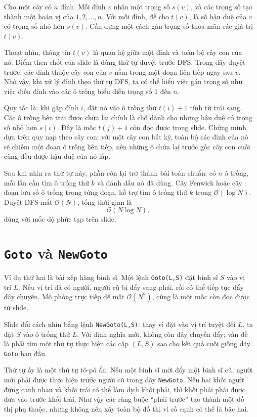 \documentclass[11pt]{article}
\newcommand{\Oh}{\mathcal{O}}
\begin{document}
Cho một cây có \(n\) đỉnh. Mỗi đỉnh \(v\) nhận một trọng số \(s(v)\), và các
trọng số tạo thành một hoán vị của \(1,2,\ldots,n\). Với mỗi đỉnh, đề cho
\(t(v)\), là số hậu duệ của \(v\) có trọng số nhỏ hơn \(s(v)\). Cần dựng một
cách gán trọng số thỏa mãn các giá trị \(t(v)\).

Thoạt nhìn, thông tin \(t(v)\) là quan hệ giữa một đỉnh và toàn bộ cây con của
nó. Điểm then chốt của slide là dùng thứ tự duyệt trước DFS. Trong dãy duyệt
trước, các đỉnh thuộc cây con của \(v\) nằm trong một đoạn liên tiếp ngay sau
\(v\). Nhờ vậy, khi xử lý đỉnh theo thứ tự DFS, ta có thể hiểu việc gán trọng
số như việc điền đỉnh vào các ô trống biểu diễn trọng số \(1\) đến \(n\).

Quy tắc là: khi gặp đỉnh \(i\), đặt nó vào ô trống thứ \(t(i)+1\) tính từ
trái sang. Các ô trống bên trái được chừa lại chính là chỗ dành cho những hậu
duệ có trọng số nhỏ hơn \(s(i)\). Đây là mốc \(t(j)+1\) còn đọc được trong
slide. Chứng minh dựa trên quy nạp theo cây con: với một cây con bất kỳ, toàn
bộ các đỉnh của nó sẽ chiếm một đoạn ô trống liên tiếp, nên những ô chừa lại
trước gốc cây con cuối cùng đều được hậu duệ của nó lấp.

Sau khi nhìn ra thứ tự này, phần còn lại trở thành bài toán chuẩn: có \(n\)
ô trống, mỗi lần cần tìm ô trống thứ \(k\) và đánh dấu nó đã dùng. Cây Fenwick
hoặc cây đoạn lưu số ô trống trong từng đoạn, hỗ trợ tìm ô trống thứ \(k\)
trong \(\Oh(\log N)\). Duyệt DFS mất \(\Oh(N)\), tổng thời gian là
\[
  \Oh(N\log N),
\]
đúng với mốc độ phức tạp trên slide.

\section{\texttt{Goto} và \texttt{NewGoto}}

Ví dụ thứ hai là bài xếp hàng binh sĩ. Một lệnh \texttt{Goto(L,S)} đặt binh
sĩ \(S\) vào vị trí \(L\). Nếu vị trí đã có người, người cũ bị đẩy sang phải,
rồi có thể tiếp tục đẩy dây chuyền. Mô phỏng trực tiếp dễ mất
\(\Oh(N^2)\), cũng là một mốc còn đọc được từ slide.

Slide đổi cách nhìn bằng lệnh \texttt{NewGoto(L,S)}: thay vì đặt vào vị trí
tuyệt đối \(L\), ta đặt \(S\) vào ô trống thứ \(L\). Với định nghĩa mới,
không còn dây chuyền đẩy; vấn đề là phải tìm một thứ tự thực hiện các cặp
\((L,S)\) sao cho kết quả cuối giống dãy \texttt{Goto} ban đầu.

Thứ tự ấy là một thứ tự tô-pô ẩn. Nếu một binh sĩ mới đẩy một binh sĩ cũ,
người mới phải được thực hiện trước người cũ trong dãy \texttt{NewGoto}. Nếu
hai khối người đứng cạnh nhau và khối trái có thể làm dịch khối phải, thì
khối phải phải được đưa vào trước khối trái. Như vậy các ràng buộc ``phải
trước'' tạo thành một đồ thị phụ thuộc, nhưng không nên xây toàn bộ đồ thị vì
số cạnh có thể là bậc hai.
\end{document}

